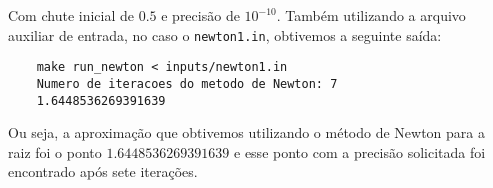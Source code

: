 Com chute inicial de \(0.5\) e precisão de \(10^{-10}\). Também utilizando a
arquivo auxiliar de entrada, no caso o \texttt{newton1.in}, obtivemos a seguinte
saída:

\begin{verbatim}
	make run_newton < inputs/newton1.in
	Numero de iteracoes do metodo de Newton: 7
	1.6448536269391639
\end{verbatim}

Ou seja, a aproximação que obtivemos utilizando o método de Newton para a raiz
foi o ponto \(1.6448536269391639\) e esse ponto com a precisão solicitada foi
encontrado após sete iterações.
